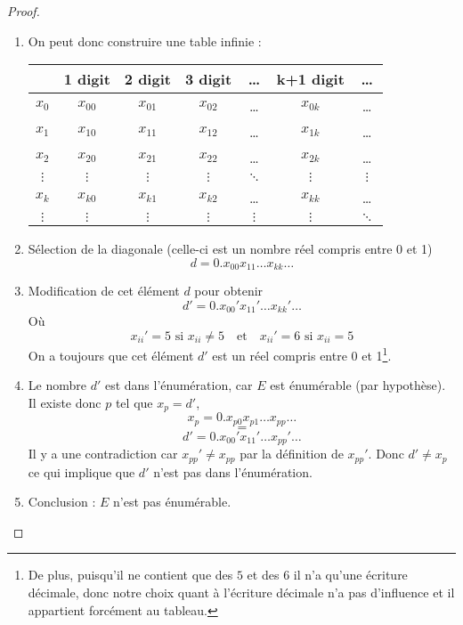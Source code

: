 \begin{mytheo}
\begin{proof}
		\begin{enumerate}
			\item On peut donc construire une table infinie : \\
				\begin{tabular}{|c||c|c|c|c|c|c|}
					\hline
					& 1 digit & 2 digit & 3 digit & \dots & k+1 digit & \dots \\
					\hline
					$x_0$ & $x_{00}$ & $x_{01}$ & $x_{02}$ & \dots & $x_{0k}$ & \dots \\
					$x_1$ & $x_{10}$ & $x_{11}$ & $x_{12}$ & \dots & $x_{1k}$ & \dots \\
					$x_2$ & $x_{20}$ & $x_{21}$ & $x_{22}$ & \dots & $x_{2k}$ & \dots \\
					$\vdots$& $\vdots$& $\vdots$& $\vdots$& $\ddots$& $\vdots$& $\vdots$\\
					$x_k$ & $x_{k0}$ & $x_{k1}$ & $x_{k2}$ & \dots & $x_{kk}$ & \dots \\
					$\vdots$& $\vdots$& $\vdots$& $\vdots$& $\vdots$& $\vdots$& $\ddots$\\
					\hline
				\end{tabular}
			\item Sélection de la diagonale (celle-ci est un nombre réel compris
				entre 0 et 1)
				\[ d=0.x_{00}x_{11}\dots x_{kk}\dots \]
			\item Modification de cet élément $d$ pour obtenir
				\[ d'=0.x_{00}'x_{11}'\dots x_{kk}'\dots \]
				Où
                $$x_{ii}'=5\text{ si }x_{ii}\neq 5\quad\text{et}\quad x_{ii}'=6\text{ si }x_{ii}= 5$$
				On a toujours que cet élément $d'$ est un réel compris entre 0 et 1\footnote{De plus, puisqu'il ne contient que des $5$ et des $6$ il n'a qu'une écriture décimale, donc notre choix quant à l'écriture décimale n'a pas d'influence et il appartient forcément au tableau.}.
			\item Le nombre $d'$ est dans l'énumération, car $E$ est
				énumérable (par hypothèse). Il existe donc $p$ tel que $x_p=d'$,
				\[ x_p=0.x_{p0}x_{p1}\dots x_{pp}\dots \]
				\[=\]
				\[ d'=0.x_{00}'x_{11}'\dots x_{pp}'\dots \]
				Il y a une contradiction car $x_{pp}' \neq
			       	x_{pp}$ par la définition de $x_{pp}'$. Donc $d' \neq x_p$ ce qui implique que $d'$ n'est pas
				dans l'énumération.
			\item Conclusion : $E$ n'est pas énumérable.
		\end{enumerate}
	\end{proof}
\end{mytheo}

